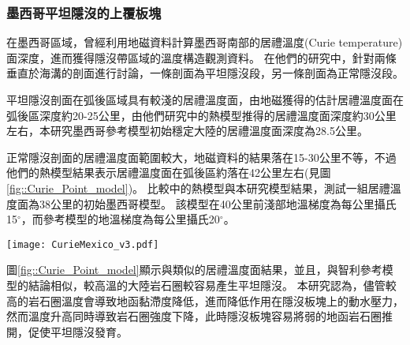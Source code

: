 
\subsubsection{墨西哥平坦隱沒的上覆板塊}
在墨西哥區域，\citet{Manea2011Curie}曾經利用地磁資料計算墨西哥南部的居禮溫度(Curie temperature)面深度，進而獲得隱沒帶區域的溫度構造觀測資料。
在他們的研究中，針對兩條垂直於海溝的剖面進行討論，一條剖面為平坦隱沒段，另一條剖面為正常隱沒段。

平坦隱沒剖面在弧後區域具有較淺的居禮溫度面，由地磁獲得的估計居禮溫度面在弧後區深度約20-25公里，由他們研究中的熱模型推得的居禮溫度面深度約30公里左右，本研究墨西哥參考模型初始穩定大陸的居禮溫度面深度為28.5公里。

正常隱沒剖面的居禮溫度面範圍較大，地磁資料的結果落在15-30公里不等，不過他們的熱模型結果表示居禮溫度面在弧後區約落在42公里左右(見圖\ref{fig::Curie_Point_model})。
比較\citet{Manea2011Curie}中的熱模型與本研究模型結果，測試一組居禮溫度面為38公里的初始墨西哥模型。
該模型在40公里前淺部地溫梯度為每公里攝氏15$^\circ$，而參考模型的地溫梯度為每公里攝氏20$^\circ$。

\begin{figure*}[ht!]
    \centering
    \texttt{[image: CurieMexico\_v3.pdf]}
    \caption[墨西哥兩條剖面的居禮溫度面與熱構造模型與不同地溫梯度的墨西哥模型在30 Myr的隱沒板塊構造與580$^\circ$等溫線]{(a)(b)(d)(e)墨西哥兩條剖面的居禮溫度面與熱構造模型，摘自\citet{Manea2011Curie}。(c)(f)不同地溫梯度的墨西哥模型在30 Myr的隱沒板塊構造(黑線)於100公里以上之剖面與580$^\circ$等溫線(橘線)，幾何形狀取自隱沒板塊頂部，使用5公里移動平均平滑離散化的網格。(a)繪出平坦隱沒區域的居禮溫度面(紅線，虛線為外差值)、隱沒板塊頂部(黑線)與\citet{Manea2011Curie}中熱模型攝氏580$^\circ$等溫線。(b)\citet{Manea2011Curie}的平坦隱沒熱模型。(c)墨西哥參考模型在30 Myr的隱沒板塊構造(黑線)於100公里以上之剖面與580$^\circ$等溫線(橘線)。(d)繪出正常隱沒區域的居禮溫度面(藍線)、隱沒板塊頂部(黑線)與\citet{Manea2011Curie}中熱模型攝氏580$^\circ$等溫線。(e)\citet{Manea2011Curie}的正常隱沒熱模型。(f)測試一組於地表至40公里中每公里攝氏15$^\circ$的模型。模型於30 Myr的隱沒板塊構造(黑線)於100公里以上之剖面與580$^\circ$等溫線(橘線)。
    }
    \label{fig::Curie_Point_model}
\end{figure*}

圖\ref{fig::Curie_Point_model}顯示與\citet{Manea2011Curie}類似的居禮溫度面結果，並且，與智利參考模型的結論相似，較高溫的大陸岩石圈較容易產生平坦隱沒。
本研究認為，儘管較高的岩石圈溫度會導致地函黏滯度降低，進而降低作用在隱沒板塊上的動水壓力，然而溫度升高同時導致岩石圈強度下降，此時隱沒板塊容易將弱的地函岩石圈推開，促使平坦隱沒發育。

